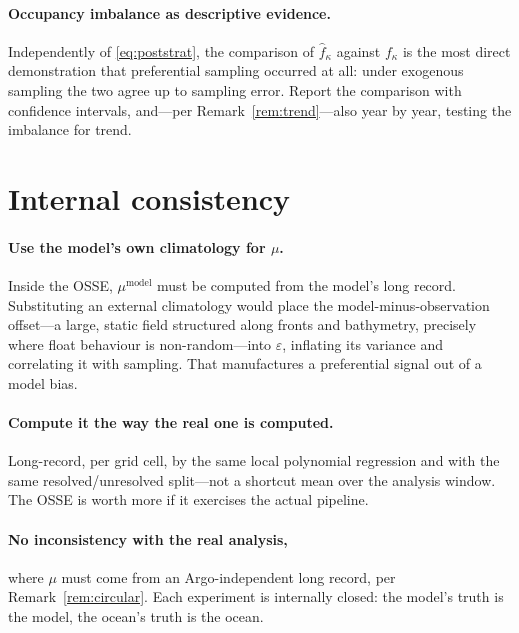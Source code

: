 \documentclass[11pt]{article}
\begin{document}
\paragraph{Occupancy imbalance as descriptive evidence.} Independently of
\eqref{eq:poststrat}, the comparison of $\hat{f}_\kappa$ against $f_\kappa$ is the most direct
demonstration that preferential sampling occurred at all: under exogenous sampling the two agree
up to sampling error. Report the comparison with confidence intervals, and---per
Remark~\ref{rem:trend}---also year by year, testing the imbalance for trend.

\section{Internal consistency}
\label{sec:consistency}

\paragraph{Use the model's own climatology for $\mu$.} Inside the OSSE, $\mu^{\text{model}}$
must be computed from the model's long record. Substituting an external climatology would place
the model-minus-observation offset---a large, static field structured along fronts and
bathymetry, precisely where float behaviour is non-random---into $\varepsilon$, inflating its
variance and correlating it with sampling. That manufactures a preferential signal out of a
model bias.

\paragraph{Compute it the way the real one is computed.} Long-record, per grid cell, by the same
local polynomial regression and with the same resolved/unresolved split---not a shortcut mean
over the analysis window. The OSSE is worth more if it exercises the actual pipeline.

\paragraph{No inconsistency with the real analysis,} where $\mu$ must come from an
Argo-independent long record, per Remark~\ref{rem:circular}. Each experiment is internally
closed: the model's truth is the model, the ocean's truth is the ocean.
\end{document}
